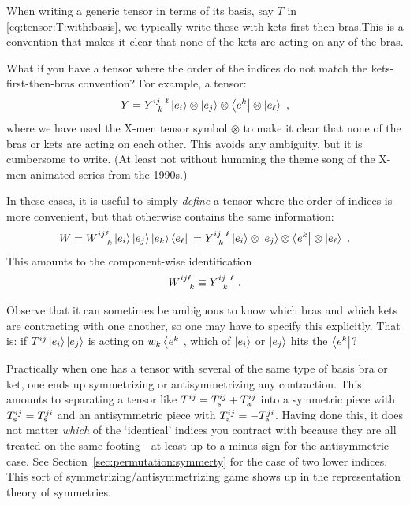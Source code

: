 \begin{example}\label{eg:why:ketbra}
When writing a generic tensor in terms of its basis, say $T$ in \eqref{eq:tensor:T:with:basis}, we typically write these with kets first then bras.\sidenotemark This is a convention that makes it clear that none of the kets are acting on any of the bras.

What if you have a tensor where the order of the indices do not match the kets-first-then-bras convention? For example, a tensor:
\begin{align}
    Y = Y^{ij\phantom{k}\ell}_{\phantom{ij}k}
    \left|e_i\right\rangle\otimes\left|e_j\right\rangle\otimes\left\langle e^k\right|\otimes\left|e_\ell\right\rangle \ ,
\end{align}
where we have used the \sout{X-men} tensor symbol $\otimes$ to make it clear that none of the bras or kets are acting on each other. This avoids any ambiguity, but it is cumbersome to write. (At least not without humming the theme song of the X-men animated series from the 1990s.)

In these cases, it is useful to simply \emph{define} a tensor where the order of indices is more convenient, but that otherwise contains the same information:
\begin{align}
    W = W\aij{ij\ell}{k} 
    \ket{e_i}\ket{e_j} \ket{e_k} \bra{e_\ell}
    \defeq 
    Y^{ij\phantom{k}\ell}_{\phantom{ij}k}
    \ket{e_i} \otimes \ket{e_j} \otimes \bra{e^k} \otimes \ket{e_\ell}
    \ .
\end{align}
This amounts to the component-wise identification
\begin{align}
    W\aij{ij\ell}{k} \equiv Y^{ij\phantom{k}\ell}_{\phantom{ij}k} \ .
\end{align}

\end{example}

Observe that it can sometimes be ambiguous to know which bras and which kets are contracting with one another, so one may have to specify this explicitly. That is: if $T^{ij} \left|e_i\right\rangle\left|e_j\right\rangle$ is acting on $w_k\left\langle e^k\right|$, which of $\left|e_i\right\rangle$ or $\left|e_j\right\rangle$ hits the $\left\langle e^k\right|$? 

Practically when one has a tensor with several of the same type of basis bra or ket, one ends up symmetrizing or antisymmetrizing any contraction. This amounts to separating a tensor like $T^{ij} = T^{ij}_\textnormal{s} + T^{ij}_\textnormal{a}$ into a symmetric piece with $T_\textnormal{s}^{ij} = T_\textnormal{s}^{ji}$ and an antisymmetric piece with $T_\textnormal{a}^{ij}=-T_\textnormal{a}^{ji}$. Having done this, it does not matter \emph{which} of the `identical' indices you contract with because they are all treated on the same footing---at least up to a minus sign for the antisymmetric case. See Section~\ref{sec:permutation:symmerty} for the case of two lower indices. This sort of symmetrizing/antisymmetrizing game shows up in the representation theory of symmetries.

